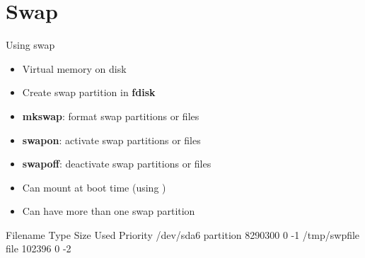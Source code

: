 \clearpage
\section{Swap}
\begin{frame}
   {Using swap}

   \begin{itemize}
      \item Virtual memory on disk
      \item Create swap partition in \textbf{fdisk}
      \item \textbf{mkswap}: format swap partitions or files
      \item \textbf{swapon}: activate swap partitions or files
      \item \textbf{swapoff}: deactivate swap partitions or files
      \item Can mount at boot time (using
      )
      \item Can have more than one swap partition
   \end{itemize}

   \begin{out}[]
Filename           Type            Size    Used    Priority
/dev/sda6          partition       8290300 0       -1
/tmp/swpfile       file            102396  0       -2
   \end{out}

\end{frame}

